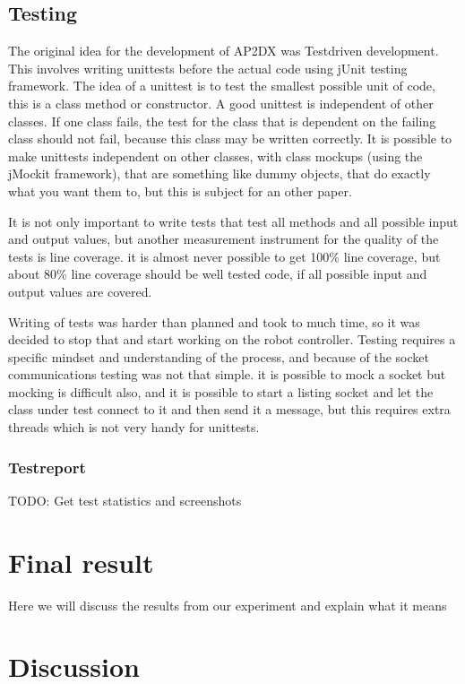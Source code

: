 \documentclass[titlepage, a4paper,10pt]{article}
\begin{document}
\subsection{Testing}
The original idea for the development of AP2DX was Testdriven development. This involves writing unittests before the actual code using jUnit testing framework. The idea of a unittest is to test the smallest possible unit of code, this is a class method or constructor. A good unittest is independent of other classes. If one class fails, the test for the class that is dependent on the failing class should not fail, because this class may be written correctly. It is possible to make unittests independent on other classes, with class mockups (using the jMockit framework), that are something like dummy objects, that do exactly what you want them to, but this is subject for an other paper.

It is not only important to write tests that test all methods and all possible input and output values, but another measurement instrument for the quality of the tests is line coverage. it is almost never possible to get 100\% line coverage, but about 80\% line coverage should be well tested code, if all possible input and output values are covered.

Writing of tests was harder than planned and took to much time, so it was decided to stop that and start working on the robot controller. Testing requires a specific mindset and understanding of the process, and because of the socket communications testing was not that simple. it is possible to mock a socket but mocking is difficult also, and it is possible to start a listing socket and let the class under test connect to it and then send it a message, but this requires extra threads which is not very handy for unittests.

\subsubsection{Testreport}
TODO: Get test statistics and screenshots

\newpage

\section{Final result}
Here we will discuss the results from our experiment and explain what it means

\newpage

\section{Discussion}


\appendix

\end{document}
